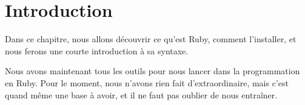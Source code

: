 \chapter{Introduction}

Dans ce chapitre, nous allons découvrir ce qu’est Ruby, comment l’installer, et nous ferons une courte introduction à sa syntaxe.






Nous avons maintenant tous les outils pour nous lancer dans la programmation en Ruby. Pour le moment, nous n’avons rien fait d’extraordinaire, mais c’est quand même une base à avoir, et il ne faut pas oublier de nous entraîner.
